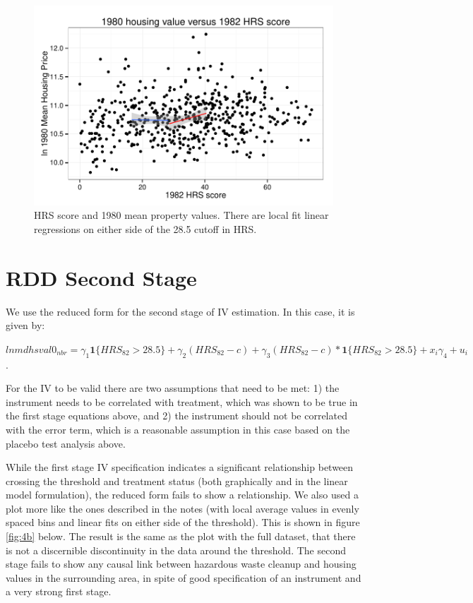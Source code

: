 \documentclass[letterpaper, 12pt]{article}
\newcommand{\ind}[1]{\textbf{1}\{#1\}}
\begin{document}
\begin{figure}[htbp!]
\begin{center}
\includegraphics{fig-3c.pdf}
\caption{HRS score and 1980 mean property values.  There are local fit linear regressions on either side of the 28.5 cutoff in HRS.}
\label{fig:3c}
\end{center}
\end{figure}


\section{RDD Second Stage}

We use the reduced form for the second stage of IV estimation.  In this case, it is given by: 

$lnmdhsval0_{nbr}=\gamma_1\ind{HRS_{82} > 28.5} +\gamma_2(HRS_{82}-c) + \gamma_3(HRS_{82}-c)*\ind{HRS_{82} > 28.5}+x_i\gamma_4+u_i$.

For the IV to be valid there are two assumptions that need to be met: 1) the instrument needs to be correlated with treatment, which was shown to be true in the first stage equations above, and 2) the instrument should not be correlated with the error term, which is a reasonable assumption in this case based on the placebo test analysis above.  

While the first stage IV specification indicates a significant relationship between crossing the threshold and treatment status (both graphically and in the linear model formulation), the reduced form fails to show a relationship. We also used a plot more like the ones described in the notes (with local average values in evenly spaced bins and linear fits on either side of the threshold).  This is shown in figure \ref{fig:4b} below.  The result is the same as the plot with the full dataset, that there is not a discernible discontinuity in the data around the threshold.  The second stage fails to show any causal link between hazardous waste cleanup and housing values in the surrounding area, in spite of good specification of an instrument and a very strong first stage.  
\end{document}
